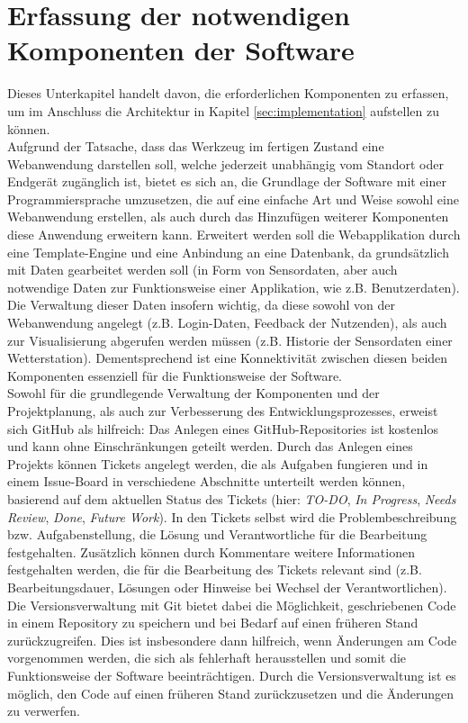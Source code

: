 \section{Erfassung der notwendigen Komponenten der Software}
Dieses Unterkapitel handelt davon, die erforderlichen Komponenten zu erfassen, um im Anschluss die Architektur in Kapitel \ref{sec:implementation} aufstellen zu können. \\ Aufgrund der Tatsache, dass das Werkzeug im fertigen Zustand eine Webanwendung darstellen soll, welche jederzeit unabhängig vom Standort oder Endgerät zugänglich ist, bietet es sich an, die Grundlage der Software mit einer Programmiersprache umzusetzen, die auf eine einfache Art und Weise sowohl eine Webanwendung erstellen, als auch durch das Hinzufügen weiterer Komponenten diese Anwendung erweitern kann. Erweitert werden soll die Webapplikation durch eine Template-Engine und eine Anbindung an eine Datenbank, da grundsätzlich mit Daten gearbeitet werden soll (in Form von Sensordaten, aber auch notwendige Daten zur Funktionsweise einer Applikation, wie z.B. Benutzerdaten). Die Verwaltung dieser Daten insofern wichtig, da diese sowohl von der Webanwendung angelegt (z.B. Login-Daten, Feedback der Nutzenden), als auch zur Visualisierung abgerufen werden müssen (z.B. Historie der Sensordaten einer Wetterstation). Dementsprechend ist eine Konnektivität zwischen diesen beiden Komponenten essenziell für die Funktionsweise der Software. \\ Sowohl für die grundlegende Verwaltung der Komponenten und der Projektplanung, als auch zur Verbesserung des Entwicklungsprozesses, erweist sich GitHub als hilfreich: Das Anlegen eines GitHub-Repositories ist kostenlos und kann ohne Einschränkungen geteilt werden. Durch das Anlegen eines Projekts können Tickets angelegt werden, die als Aufgaben fungieren und in einem Issue-Board in verschiedene Abschnitte unterteilt werden können, basierend auf dem aktuellen Status des Tickets (hier: \textit{TO-DO}, \textit{In Progress}, \textit{Needs Review}, \textit{Done}, \textit{Future Work}). In den Tickets selbst wird die Problembeschreibung bzw. Aufgabenstellung, die Lösung und Verantwortliche für die Bearbeitung festgehalten. Zusätzlich können durch Kommentare weitere Informationen festgehalten werden, die für die Bearbeitung des Tickets relevant sind (z.B. Bearbeitungsdauer, Lösungen oder Hinweise bei Wechsel der Verantwortlichen). \\ Die Versionsverwaltung mit Git bietet dabei die Möglichkeit, geschriebenen Code in einem Repository zu speichern und bei Bedarf auf einen früheren Stand zurückzugreifen. Dies ist insbesondere dann hilfreich, wenn Änderungen am Code vorgenommen werden, die sich als fehlerhaft herausstellen und somit die Funktionsweise der Software beeinträchtigen. Durch die Versionsverwaltung ist es möglich, den Code auf einen früheren Stand zurückzusetzen und die Änderungen zu verwerfen. 

